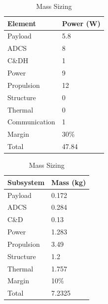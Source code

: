\begin{table}[hbt!]
\parbox{.5\linewidth}{
\centering
                \begin{tabular}{ll}
                    
                        \rowcolor{gray!50} 
                        \textbf{Element}       & \textbf{Power (W)} \\ \hline
                        Payload       & 5.8                \\
                        ADCS          & 8                  \\
                        C\&DH         & 1                  \\
                        Power         & 9                  \\
                        Propulsion    & 12                 \\
                        Structure     & 0                  \\
                        Thermal      & 0                  \\
                        Communication & 1                  \\
                        Margin        & 30\%               \\ \hline
                        Total         & 47.84 \\
                \end{tabular}
                    \caption{Power Sizing}
                    \label{Tab:ps}
        }
\hfill
\parbox{.5\linewidth}{
\centering
                \begin{tabular}{ll}
                        \rowcolor{gray!50}
                        \textbf{Subsystem}      & \textbf{Mass (kg)} \\ \hline
                        Payload     & 0.172 \\ 
                        ADCS        & 0.284 \\  
                        C\&D        & 0.13 \\
                        Power       & 1.283 \\  
                        Propulsion  & 3.49 \\  
                        Structure   & 1.2 \\
                        Thermal     & 1.757 \\
                        Margin      & 10\% \\\hline
                        Total       & 7.2325 \\
                \end{tabular}
\caption{Mass Sizing}
\label{Tab:ms}
}
\end{table}
\vspace{1cm}
